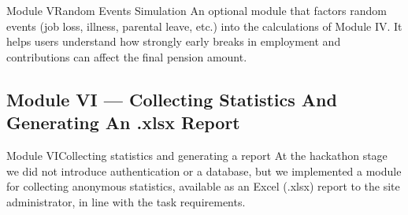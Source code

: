 \begin{frame}[t]{Module V}{Random Events Simulation}
An optional module that factors random events (job loss, illness, parental leave, etc.)
into the calculations of Module IV.
\pause
It helps users understand how strongly early breaks in employment and contributions
can affect the final pension amount.
\end{frame}

\subsection{Module VI --- Collecting Statistics And Generating An .xlsx Report}

\begin{frame}[t]{Module VI}{Collecting statistics and generating a report}
At the hackathon stage we did not introduce authentication or a database,
but we implemented a module for collecting anonymous statistics,
available as an Excel (.xlsx) report to the site administrator,
in line with the task requirements.
\end{frame}
